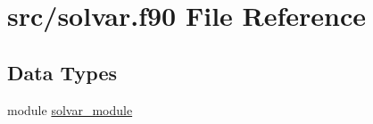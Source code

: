 \hypertarget{solvar_8f90}{\section{src/solvar.f90 File Reference}
\label{solvar_8f90}
}
\subsection*{Data Types}
\begin{DoxyCompactItemize}
\item 
module \hyperlink{classsolvar__module}{solvar\-\_\-module}
\end{DoxyCompactItemize}
